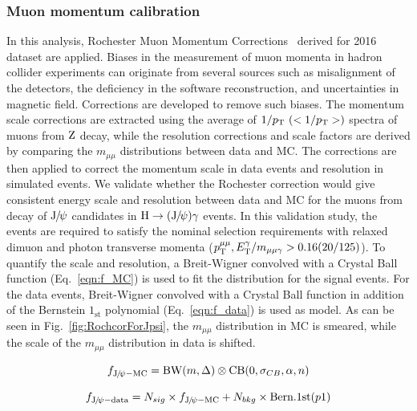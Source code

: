 		\subsubsection{Muon momentum calibration}
		In this analysis, Rochester Muon Momentum Corrections~\cite{Bodek:2012id} derived for 2016 dataset are applied.
		Biases in the measurement of muon momenta in hadron collider experiments can originate from several sources such as misalignment of the detectors, the deficiency in the software reconstruction, and uncertainties in magnetic field. Corrections are developed to remove such biases. The momentum scale corrections are extracted using the average of $1/\pt \ (<1/\pt>)$ spectra of muons from $\mathrm{Z}$ decay, while the resolution corrections and scale factors are derived by comparing the $m_{\mu\mu}$ distributions between data and MC. The corrections are then applied to correct the momentum scale in data events and resolution in simulated events. 
		We validate whether the Rochester correction would give consistent energy scale and resolution between data and MC for the muons from decay of ${\mathrm{J}\hspace{-.08em}/\hspace{-.14em}\psi}$ candidates in $\mathrm{H}\to({\mathrm{J}\hspace{-.08em}/\hspace{-.14em}\psi})\gamma$ events. In this validation study, the events are required to satisfy the nominal selection requirements with relaxed dimuon and photon transverse momenta ($p_{\mathrm{T}}^{\mu\mu}, E_{\mathrm{T}}^{\gamma}/m_{\mu\mu\gamma} > 0.16(20/125)$). To quantify the scale and resolution, a Breit-Wigner convolved with a Crystal Ball function (Eq.~\ref{eqn:f_MC}) is used to fit the distribution for the signal events. For the data events, Breit-Wigner convolved with a Crystal Ball function in addition of the Bernstein $1_{\text{st}}$ polynomial (Eq.~\ref{eqn:f_data}) is used as model. As can be seen in Fig.~\ref{fig:RochcorForJpsi}, the $m_{\mu\mu}$ distribution in MC is smeared, while the scale of the $m_{\mu\mu}$ distribution in data is shifted. 
		
		\begin{equation}
		f_{{\mathrm{J}\hspace{-.08em}/\hspace{-.14em}\psi} - \text{MC}} = \text{BW}(m,\Delta)\otimes \text{CB}(0,\sigma_{CB},\alpha,n)
		\label{eqn:f_MC}
		\end{equation}
		
		\begin{equation}
		f_{{\mathrm{J}\hspace{-.08em}/\hspace{-.14em}\psi} - \text{data}} = N_{sig}\times f_{{\mathrm{J}\hspace{-.08em}/\hspace{-.14em}\psi} - \text{MC}} + N_{bkg}\times \text{Bern.1st}(p1) 
		\label{eqn:f_data}
		\end{equation}
		
